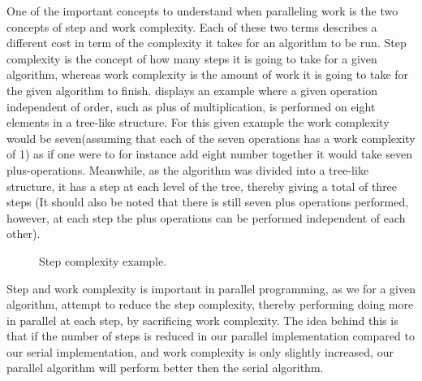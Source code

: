 One of the important concepts to understand when paralleling work is the two concepts of step and work complexity. Each of these two terms describes a different cost in term of the complexity it takes for an algorithm to be run. Step complexity is the concept of how many steps it is going to take for a given algorithm, whereas work complexity is the amount of work it is going to take for the given algorithm to finish.  displays an example where a given operation independent of order, such as plus of multiplication, is performed on eight elements in a tree-like structure. For this given example the work complexity would be seven(assuming that each of the seven operations has a work complexity of 1) as if one were to for instance add eight number together it would take seven plus-operations. Meanwhile, as the algorithm was divided into a tree-like structure, it has a step at each level of the tree, thereby giving a total of three steps (It should also be noted that there is still seven plus operations performed, however, at each step the plus operations can be performed independent of each other).

\begin{figure}[ht]
	\centering
	\caption{Step complexity example.}
	\label{fig:stepnwork}
\end{figure}

Step and work complexity is important in parallel programming, as we for a given algorithm, attempt to reduce the step complexity, thereby performing doing more in parallel at each step, by sacrificing work complexity. The idea behind this is that if the number of steps is reduced in our parallel implementation compared to our serial implementation, and work complexity is only slightly increased, our parallel algorithm will perform better then the serial algorithm.